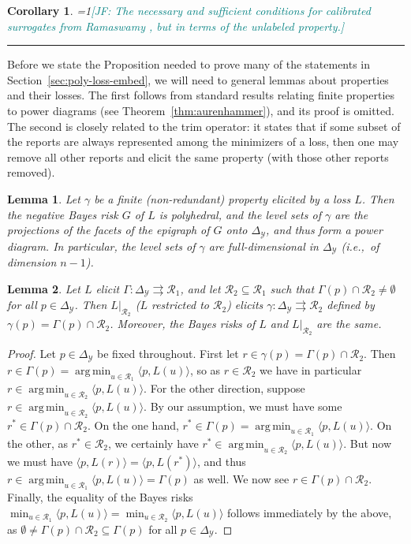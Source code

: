 \documentclass[11pt]{article}
\newcommand{\Comments}{1}
\newcommand{\mynote}[2]{\ifnum\Comments=1\textcolor{#1}{#2}\fi}
\newcommand{\jessie}[1]{\mynote{teal}{[JF: #1]}}
\newcommand{\simplex}{\Delta_\Y}
\newcommand{\R}{\mathcal{R}}
\newcommand{\Y}{\mathcal{Y}}
\newcommand{\inprod}[2]{\langle #1, #2 \rangle}%
\newcommand{\toto}{\rightrightarrows}
\DeclareMathOperator*{\argmin}{arg\,min}
\newtheorem{lemma}{Lemma}
\newtheorem{corollary}{Corollary}
\begin{document}
\begin{corollary}
	\jessie{The necessary and sufficient conditions for calibrated surrogates from Ramaswamy \cite{ramaswamy2016convex}, but in terms of the unlabeled property.}
\end{corollary}
\hrule

Before we state the Proposition needed to prove many of the statements in Section~\ref{sec:poly-loss-embed}, we will need to general lemmas about properties and their losses.
The first follows from standard results relating finite properties to power diagrams (see Theorem~\ref{thm:aurenhammer}), and its proof is omitted.
The second is closely related to the trim operator: it states that if some subset of the reports are always represented among the minimizers of a loss, then one may remove all other reports and elicit the same property (with those other reports removed).

\begin{lemma}\label{lem:finite-full-dim}
  Let $\gamma$ be a finite (non-redundant) property elicited by a loss $L$.
  Then the negative Bayes risk $G$ of $L$ is polyhedral, and the level sets of $\gamma$ are the projections of the facets of the epigraph of $G$ onto $\simplex$, and thus form a power diagram.
  In particular, the level sets of $\gamma$ are full-dimensional in $\simplex$ (i.e.,\ of dimension $n-1$).
\end{lemma}

\begin{lemma}\label{lem:loss-restrict}
  Let $L$ elicit $\Gamma:\simplex\toto\R_1$, and let $\R_2\subseteq\R_1$ such that $\Gamma(p) \cap \R_2 \neq \emptyset$ for all $p\in\simplex$.
  Then $L|_{\R_2}$ ($L$ restricted to $\R_2$) elicits $\gamma:\simplex\toto\R_2$ defined by $\gamma(p) = \Gamma(p)\cap \R_2$.
  Moreover, the Bayes risks of $L$ and $L|_{\R_2}$ are the same.
\end{lemma}
\begin{proof}
  Let $p\in\simplex$ be fixed throughout.
  First let $r \in \gamma(p) = \Gamma(p) \cap \R_2$.
  Then $r \in \Gamma(p) = \argmin_{u\in\R_1} \inprod{p}{L(u)}$, so as $r\in\R_2$ we have in particular $r \in \argmin_{u\in\R_2} \inprod{p}{L(u)}$.
  For the other direction, suppose $r \in \argmin_{u\in\R_2} \inprod{p}{L(u)}$.
  By our assumption, we must have some $r^* \in \Gamma(p) \cap \R_2$.
  On the one hand, $r^*\in\Gamma(p) = \argmin_{u\in\R_1} \inprod{p}{L(u)}$.
  On the other, as $r^* \in \R_2$, we certainly have $r^* \in \argmin_{u\in\R_2} \inprod{p}{L(u)}$.
  But now we must have $\inprod{p}{L(r)} = \inprod{p}{L(r^*)}$, and thus $r \in \argmin_{u\in\R_1} \inprod{p}{L(u)} = \Gamma(p)$ as well.
  We now see $r \in \Gamma(p) \cap \R_2$.
  Finally, the equality of the Bayes risks $\min_{u\in\R_1} \inprod{p}{L(u)} = \min_{u\in\R_2} \inprod{p}{L(u)}$ follows immediately by the above, as $\emptyset \neq \Gamma(p)\cap\R_2 \subseteq \Gamma(p)$ for all $p\in\simplex$.
\end{proof}
\end{document}
